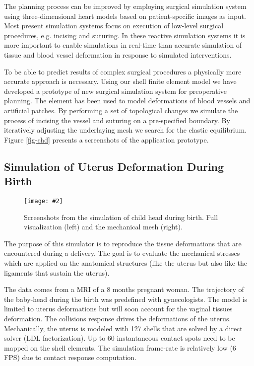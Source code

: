 \documentclass{egpubl}
\newcommand{\FigureW}[3]{%
\begin{figure*}[htb]
  \centering
  \texttt{[image: \#2]}
  \caption{\label{fig-#2}#3}
\end{figure*}}
\begin{document}
The planning process can be improved by employing surgical simulation system
using three-dimensional heart models based on patient-specific images as input.
Most present simulation systems focus on execution of low-level surgical
procedures, e.g. incising and suturing. In these reactive simulation systems it
is more important to enable simulations in real-time than accurate simulation
of tissue and blood vessel deformation in response to simulated interventions.

To be able to predict results of complex surgical procedures a physically more
accurate approach is necessary. Using our shell finite element model we have
developed a prototype \cite{Kislinskiy2012} of new surgical simulation system
for preoperative planning. The element has been used to model deformations of
blood vessels and artificial patches. By performing a set of topological changes
we simulate the process of incising the vessel and suturing on a pre-specified
boundary. By iteratively adjusting the underlaying mesh we search for the
elastic equilibrium. Figure \ref{fig-chd} presents a screenshots of the
application prototype.

%
%


\subsection{Simulation of Uterus Deformation During Birth}

\FigureW{\linewidth}{birth}
{Screenshots from the simulation of child head during birth. Full visualization (left) and the mechanical mesh (right).}

The purpose of this simulator is to reproduce the tissue deformations that are encountered during a delivery.
The goal is to evaluate the mechanical stresses which are applied on the anatomical structures (like the uterus but also like the ligaments that sustain the uterus).

The data comes from a MRI of a 8 months pregnant woman. 
The trajectory of the baby-head during the birth was predefined with gynecologists. 
The model is limited to uterus deformations but will soon account for the vaginal tissues deformation.
The collisions response drives the deformations of the uterus.
Mechanically, the uterus is modeled with 127 shells that are solved by a direct solver (LDL factorization).
Up to 60 instantaneous contact spots need to be mapped on the shell elements. 
The simulation frame-rate is relatively low (6 FPS) due to contact response computation.
\end{document}
